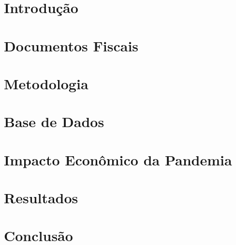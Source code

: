 \documentclass[mestrado, pre-defesa]{packages/icmc}
\begin{document}
\textual

\chapter{Introdução}
\label{chapter:introducao}


\chapter{Documentos Fiscais}
\label{chapter:documenos-fiscais}


\chapter{Metodologia}
\label{chapter:metodologia}


\chapter{Base de Dados}
\label{chapter:base-de-dados}


\chapter{Impacto Econômico da Pandemia}
\label{chapter:impacto-economico}


\chapter{Resultados}
\label{chapter:resultados}


\chapter{Conclusão}
\label{chapter:conclusão}


% 

\postextual


\end{document}
